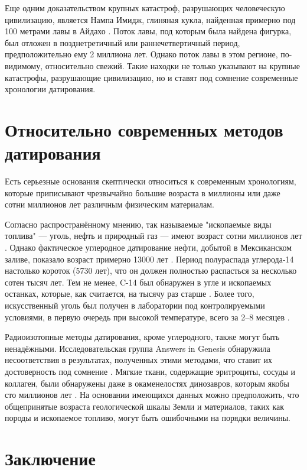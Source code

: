 \documentclass[10pt,twocolumn,letterpaper]{article}
\begin{document}
Еще одним доказательством крупных катастроф, разрушающих человеческую цивилизацию, является Нампа Имидж, глиняная кукла, найденная примерно под 100 метрами лавы в Айдахо \cite{102,103}. Поток лавы, под которым была найдена фигурка, был отложен в позднетретичный или раннечетвертичный период, предположительно ему 2 миллиона лет. Однако поток лавы в этом регионе, по-видимому, относительно свежий. Такие находки не только указывают на крупные катастрофы, разрушающие цивилизацию, но и ставят под сомнение современные хронологии датирования.

\section{Относительно современных методов датирования}

Есть серьезные основания скептически относиться к современным хронологиям, которые приписывают чрезвычайно большие возраста в миллионы или даже сотни миллионов лет различным физическим материалам.

Согласно распространённому мнению, так называемые "ископаемые виды топлива" — уголь, нефть и природный газ — имеют возраст сотни миллионов лет \cite{104}. Однако фактическое углеродное датирование нефти, добытой в Мексиканском заливе, показало возраст примерно 13000 лет \cite{105}. Период полураспада углерода-14 настолько короток (5730 лет), что он должен полностью распасться за несколько сотен тысяч лет. Тем не менее, C-14 был обнаружен в угле и ископаемых останках, которые, как считается, на тысячу раз старше \cite{106}. Более того, искусственный уголь был получен в лаборатории под контролируемыми условиями, в первую очередь при высокой температуре, всего за 2–8 месяцев \cite{107}.

Радиоизотопные методы датирования, кроме углеродного, также могут быть ненадёжными. Исследовательская группа Answers in Genesis обнаружила несоответствия в результатах, полученных этими методами, что ставит их достоверность под сомнение \cite{108}. Мягкие ткани, содержащие эритроциты, сосуды и коллаген, были обнаружены даже в окаменелостях динозавров, которым якобы сто миллионов лет \cite{109,110}. На основании имеющихся данных можно предположить, что общепринятые возраста геологической шкалы Земли и материалов, таких как породы и ископаемое топливо, могут быть ошибочными на порядки величины.

\section{Заключение}
\end{document}
